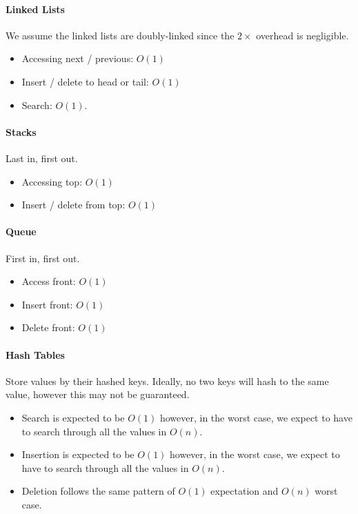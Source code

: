 \paragraph{Linked Lists}
We assume the linked lists are doubly-linked since the \(2\times \)
overhead is negligible.

\begin{itemize}
    \item Accessing next / previous: \(O(1)\)
    \item Insert / delete to head or tail: \(O(1)\)
    \item Search: \(O(1)\).
\end{itemize}

\paragraph{Stacks}
Last in, first out.
\begin{itemize}
    \item Accessing top: \(O(1)\)
    \item Insert / delete from top: \(O(1)\)
\end{itemize}

\paragraph{Queue}
First in, first out.
\begin{itemize}
    \item Access front: \(O(1)\)
    \item Insert front: \(O(1)\)
    \item Delete front: \(O(1)\)
\end{itemize}

\paragraph{Hash Tables}
Store values by their hashed keys. Ideally, no two keys will hash to the
same value, however this may not be guaranteed.

\begin{itemize}
    \item Search is expected to be \(O(1)\) however, in the worst case, we
    expect to have to search through all the values in \(O(n)\).
    \item Insertion is expected to be \(O(1)\) however, in the worst case,
    we expect to have to search through all the values in \(O(n)\).
    \item Deletion follows the same pattern of \(O(1)\) expectation and \(O(n)\) worst case.
\end{itemize}

